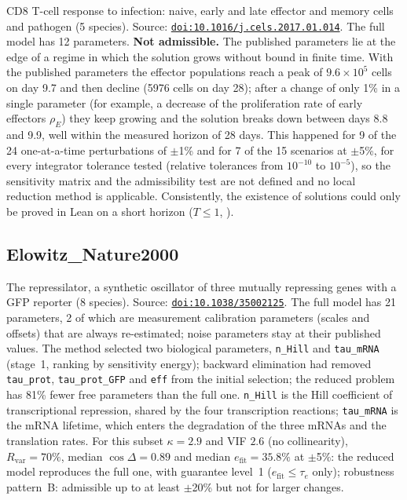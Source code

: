 CD8 T-cell response to infection: naive, early and late effector and memory cells and pathogen (5 species). Source: \href{https://doi.org/10.1016/j.cels.2017.01.014}{\nolinkurl{doi:10.1016/j.cels.2017.01.014}}. The full model has 12 parameters. \textbf{Not admissible.} The published parameters lie at the edge of a regime in which the solution grows without bound in finite time. With the published parameters the effector populations reach a peak of $9.6\times10^{5}$ cells on day 9.7 and then decline (5976 cells on day 28); after a change of only 1\% in a single parameter (for example, a decrease of the proliferation rate of early effectors $\rho_E$) they keep growing and the solution breaks down between days 8.8 and 9.9, well within the measured horizon of 28 days. This happened for 9 of the 24 one-at-a-time perturbations of $\pm$1\% and for 7 of the 15 scenarios at $\pm$5\%, for every integrator tolerance tested (relative tolerances from $10^{-10}$ to $10^{-5}$), so the sensitivity matrix and the admissibility test are not defined and no local reduction method is applicable. Consistently, the existence of solutions could only be proved in Lean on a short horizon ($T\le1$, ).

\subsection*{Elowitz\_Nature2000}

The repressilator, a synthetic oscillator of three mutually repressing genes with a GFP reporter (8 species). Source: \href{https://doi.org/10.1038/35002125}{\nolinkurl{doi:10.1038/35002125}}. The full model has 21 parameters, 2 of which are measurement calibration parameters (scales and offsets) that are always re-estimated; noise parameters stay at their published values. The method selected two biological parameters, \texttt{n\_Hill} and \texttt{tau\_mRNA} (stage~1, ranking by sensitivity energy); backward elimination had removed \texttt{tau\_prot}, \texttt{tau\_prot\_GFP} and \texttt{eff} from the initial selection; the reduced problem has 81\% fewer free parameters than the full one. \texttt{n\_Hill} is the Hill coefficient of transcriptional repression, shared by the four transcription reactions; \texttt{tau\_mRNA} is the mRNA lifetime, which enters the degradation of the three mRNAs and the translation rates. For this subset $\kappa=2.9$ and VIF $2.6$ (no collinearity), $R_{\mathrm{var}}=70\%$, median $\cos\Delta=0.89$ and median $e_{\mathrm{fit}}=35.8\%$ at $\pm$5\%: the reduced model reproduces the full one, with guarantee level~1 ($e_{\mathrm{fit}}\le\tau_e$ only); robustness pattern~B: admissible up to at least $\pm$20\% but not for larger changes.

